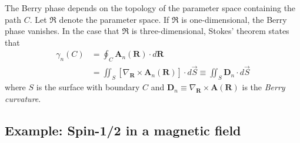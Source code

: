 \documentclass[reprint,
nofootinbib,
amsmath,amssymb,
aps]{revtex4-1}
\newcommand{\lb}{\left[}
\newcommand{\rb}{\right]}
\begin{document}
The Berry phase depends on the topology of the parameter space containing the path $C$. Let $\mathfrak{R}$ denote the parameter space. If $\mathfrak{R}$ is one-dimensional, the Berry phase vanishes. In the case that $\mathfrak{R}$ is three-dimensional, Stokes' theorem states that 
\begin{align*}
\gamma_n(C) &=  \oint_C \bm{A}_n(\bm{R}) \cdot d{\bm{R}} \\
&= \iint_{S} \lb  \nabla_{\bm{R}} \times \bm{A}_n(\bm{R}) \rb  \cdot d\vec{S} \equiv \iint_S \bm{D}_n \cdot d\vec{S}
\end{align*}
where $S$ is the surface with boundary $C$ and $\bm{D}_n \equiv \nabla_{\bm{R}} \times \bm{A}(\bm{R}) $ is the \textit{Berry curvature}. 




\subsection{Example: Spin-1/2 in a magnetic field}
\end{document}
